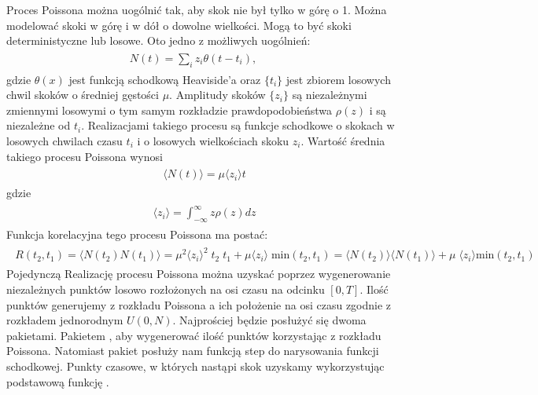 \documentclass[a4paper,12pt,polish]{sphinxmanual}
\begin{document}
Proces Poissona można uogólnić tak, aby skok nie był tylko w górę o 1. Można modelować skoki w górę i w dół o dowolne wielkości. Mogą to być skoki deterministyczne lub losowe. Oto jedno z możliwych uogólnień:
\label{ch3/chIII021:equation-eqn45}\begin{gather}
\begin{split}N(t) = \sum\limits_i z_i \theta (t-t_i), \qquad\end{split}\label{ch3/chIII021-eqn45}
\end{gather}
gdzie $\theta (x)$ jest funkcją schodkową Heaviside'a oraz $\{t_i\}$ jest zbiorem losowych chwil skoków o średniej gęstości $\mu$. Amplitudy skoków $\{z_i\}$ są niezależnymi zmiennymi losowymi o tym samym rozkładzie prawdopodobieństwa $\rho(z)$ i są niezależne od $t_i$. Realizacjami takiego procesu są funkcje schodkowe o skokach w losowych chwilach czasu $t_i$ i o losowych wielkościach skoku $z_i$. Wartość średnia takiego procesu Poissona wynosi
\label{ch3/chIII021:equation-eqn46}\begin{gather}
\begin{split}\langle N(t)\rangle = \mu\langle z_i\rangle t\end{split}\label{ch3/chIII021-eqn46}
\end{gather}
gdzie
\label{ch3/chIII021:equation-eqn47}\begin{gather}
\begin{split}\langle z_i \rangle = \int_{-\infty}^{\infty} z \rho(z) dz\end{split}\label{ch3/chIII021-eqn47}
\end{gather}
Funkcja korelacyjna tego procesu Poissona ma postać:
\label{ch3/chIII021:equation-eqn48}\begin{gather}
\begin{split}R(t_2, t_1) = \langle N(t_2) N(t_1)\rangle = \mu^2 \langle z_i\rangle^2 \;t_2 \;t_1 + \mu \langle z_i\rangle\; \mbox{min}(t_2, t_1) = \langle N(t_2)\rangle\langle N(t_1)\rangle+ \mu \;\langle z_i\rangle \mbox{min}(t_2, t_1)\end{split}\label{ch3/chIII021-eqn48}
\end{gather}
Pojedynczą Realizację procesu Poissona można uzyskać poprzez wygenerowanie  niezależnych
punktów losowo rozłożonych na osi czasu na odcinku $[0,T]$. Ilość punktów generujemy z
rozkładu Poissona a ich położenie na osi czasu zgodnie z rozkładem jednorodnym $U(0,N)$.
Najprościej będzie posłużyć się dwoma pakietami. Pakietem , aby wygenerować
ilość punktów korzystając z rozkładu Poissona. Natomiast pakiet  posłuży nam
funkcją step do narysowania funkcji schodkowej. Punkty czasowe, w których nastąpi skok
uzyskamy wykorzystując podstawową funkcję .
\end{document}

